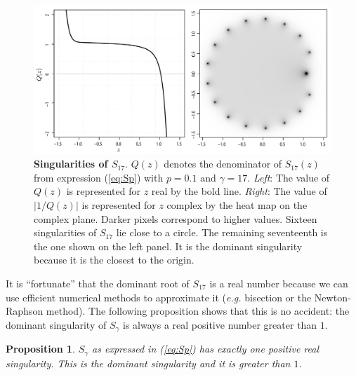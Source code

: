 \documentclass{article}
\newtheorem{proposition}{Proposition}
\begin{document}
\begin{figure}[h]
\centering
\includegraphics[scale=0.4]{singularityS.pdf}
\caption{\textbf{Singularities of $S_{17}$}. $Q(z)$ denotes the
denominator of $S_{17}(z)$ from expression (\ref{eq:Sp}) with $p=0.1$ and
$\gamma=17$. \textit{Left}: The value of $Q(z)$ is represented for $z$
real by the bold line. \textit{Right}: The value of $|1/Q(z)|$ is
represented for $z$ complex by the heat map on the complex plane. Darker
pixels correspond to higher values. Sixteen singularities of $S_{17}$ lie
close to a circle. The remaining seventeenth is the one shown on the left
panel. It is the dominant singularity because it is the closest to the
origin.}
\label{fig:plotQ}
\end{figure}

It is ``fortunate'' that the dominant root of $S_{17}$ is a real number
because we can use efficient numerical methods to approximate it
(\textit{e.g.} bisection or the Newton-Raphson method). The following
proposition shows that this is no accident: the dominant singularity of
$S_\gamma$ is always a real positive number greater than $1$.

\begin{proposition}
\label{th:roots}
$S_\gamma$ as expressed in (\ref{eq:Sp}) has exactly one positive real
singularity. This is the dominant singularity and it is greater than $1$.
\end{proposition}
\end{document}
